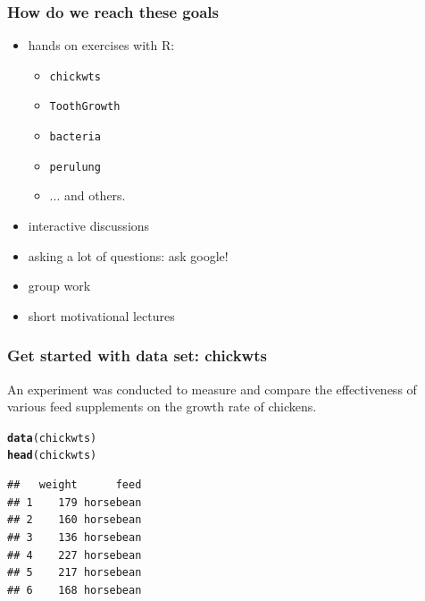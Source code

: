 \documentclass{beamer}\usepackage[]{graphicx}\usepackage[]{color}
\makeatletter
\newcommand{\hlstd}[1]{\textcolor[rgb]{0.345,0.345,0.345}{#1}}%
\newcommand{\hlkwd}[1]{\textcolor[rgb]{0.737,0.353,0.396}{\textbf{#1}}}%
\newenvironment{kframe}{%
 \def\at@end@of@kframe{}%
 \ifinner\ifhmode%
  \def\at@end@of@kframe{\end{minipage}}%
  \begin{minipage}{\columnwidth}%
 \fi\fi%
 \def\FrameCommand##1{\hskip\@totalleftmargin \hskip-\fboxsep
 \colorbox{shadecolor}{##1}\hskip-\fboxsep
     \hskip-\linewidth \hskip-\@totalleftmargin \hskip\columnwidth}%
 \MakeFramed {\advance\hsize-\width
   \@totalleftmargin\z@ \linewidth\hsize
   \@setminipage}}%
 {\par\unskip\endMakeFramed%
 \at@end@of@kframe}
\newenvironment{knitrout}{}{} %
\makeatother
\begin{document}

\begin{frame}
\frametitle{How do we reach these goals}
\begin{itemize}
\setlength\itemsep{1.2em}
\item hands on exercises with R:
\begin{itemize}
\item \texttt{chickwts}
\item \texttt{ToothGrowth}
\item \texttt{bacteria}
\item \texttt{perulung}
\item ... and others.
\end{itemize}
\item interactive discussions
\item asking a lot of questions: ask google!
\item group work
\item short motivational lectures
\end{itemize}
\end{frame}
%
%
%
%
\begin{frame}[fragile]
\frametitle{Get started with data set: chickwts}
An experiment was conducted to measure and compare the effectiveness of various
feed supplements on the growth rate of chickens.
\begin{knitrout}\scriptsize
{}\color{fgcolor}\begin{kframe}
\begin{alltt}
\hlkwd{data}\hlstd{(chickwts)}
\hlkwd{head}\hlstd{(chickwts)}
\end{alltt}
\begin{verbatim}
##   weight      feed
## 1    179 horsebean
## 2    160 horsebean
## 3    136 horsebean
## 4    227 horsebean
## 5    217 horsebean
## 6    168 horsebean
\end{verbatim}
\end{kframe}
\end{knitrout}
\end{frame}
%
\end{document}

